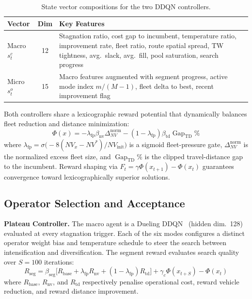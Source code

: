 \documentclass[conference]{IEEEtran}
\begin{document}
\begin{table}[!t]
\centering
\caption{State vector compositions for the two DDQN controllers.}
\label{tab:state_vectors}
\renewcommand{\arraystretch}{1.05}
\setlength{\tabcolsep}{3pt}
\small
\begin{tabular}{@{}lcp{4.8cm}@{}}
\toprule
\textbf{Vector} & \textbf{Dim} & \textbf{Key Features} \\
\midrule
Macro $s_t^c$ & 12 & Stagnation ratio, cost gap to incumbent,
  temperature ratio, improvement rate, fleet ratio, route spatial spread,
  TW tightness, avg.\ slack, avg.\ fill, pool saturation, search progress \\
\addlinespace
Micro $s_t^o$ & 15 & Macro features augmented with segment progress,
  active mode index $m/(M{-}1)$, fleet delta to best, recent improvement
  flag \\
\bottomrule
\end{tabular}
\end{table}

Both controllers share a lexicographic reward potential that dynamically
balances fleet reduction and distance minimization:
\begin{equation}
  \Phi(x) = -\lambda_{\text{fp}} \beta_{\text{nv}} \Delta_{NV}^{\text{norm}}
           - (1-\lambda_{\text{fp}}) \beta_{\text{td}}
             \operatorname{Gap}_{\text{TD}}\%
  \label{eq:potential}
\end{equation}
where $\lambda_{\text{fp}} = \sigma\bigl(-8(NV_x{-}NV^*)/NV_{\text{init}}\bigr)$
is a sigmoid fleet-pressure gate, $\Delta_{NV}^{\text{norm}}$ is the normalized
excess fleet size, and $\operatorname{Gap}_{\text{TD}}\%$ is the clipped
travel-distance gap to the incumbent.  Reward shaping via
$F_t = \gamma\Phi(x_{t+1}) - \Phi(x_t)$ guarantees convergence toward
lexicographically superior solutions.

\subsection{Operator Selection and Acceptance}

\textbf{Plateau Controller.}
The macro agent is a Dueling DDQN~\cite{wang2016dueling} (hidden dim.\ 128)
evaluated at every stagnation trigger.  Each of the six modes configures a
distinct operator weight bias and temperature schedule to steer the search
between intensification and diversification.  The segment reward evaluates
search quality over $S{=}100$ iterations:
\begin{equation}
  R_{\text{seg}} = \beta_{\text{seg}}\bigl[R_{\text{base}}
    + \lambda_{\text{fp}} R_{\text{nv}}
    + (1{-}\lambda_{\text{fp}}) R_{\text{td}}\bigr]
    + \gamma_c\Phi(x_{t+S}) - \Phi(x_t)
  \label{eq:rseg}
\end{equation}
where $R_{\text{base}}$, $R_{\text{nv}}$, and $R_{\text{td}}$ respectively
penalise operational cost, reward vehicle reduction, and reward distance
improvement.
\end{document}
